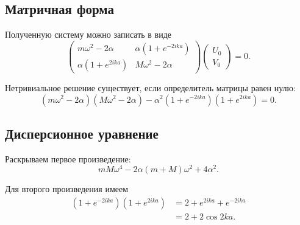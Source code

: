 \documentclass[../final.tex]{subfiles}
\begin{document}

\subsection*{Матричная форма}

Полученную систему можно записать в виде
%
\begin{equation*}
    \begin{pmatrix}
        m\omega^2-2\alpha
        &
        \alpha(1+e^{-2ika})
        \\[2mm]
        \alpha(1+e^{2ika})
        &
        M\omega^2-2\alpha
    \end{pmatrix}
    \begin{pmatrix}
        U_0
        \\
        V_0
    \end{pmatrix}
    =
    0.
\end{equation*}
%

Нетривиальное решение существует,
если определитель матрицы равен нулю:
%
\begin{equation*}
    \left(
        m\omega^2-2\alpha
    \right)
    \left(
        M\omega^2-2\alpha
    \right)
    -
    \alpha^2
    \left(
        1+e^{-2ika}
    \right)
    \left(
        1+e^{2ika}
    \right)
    =
    0.
\end{equation*}



\subsection*{Дисперсионное уравнение}

Раскрываем первое произведение:
%
\begin{equation*}
    mM\omega^4
    -
    2\alpha(m+M)\omega^2
    +
    4\alpha^2.
\end{equation*}
%

Для второго произведения имеем
%
\begin{align*}
    \left(
        1+e^{-2ika}
    \right)
    \left(
        1+e^{2ika}
    \right)
    &=
    2
    +
    e^{2ika}
    +
    e^{-2ika}
    \\
    &=
    2
    +
    2\cos 2ka.
\end{align*}
%
\end{document}
